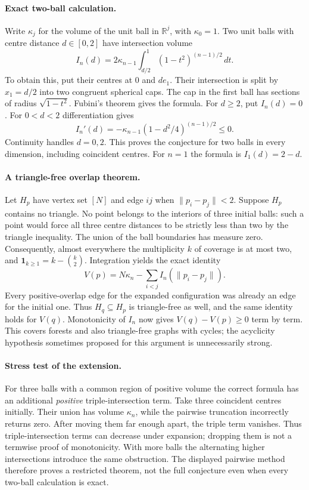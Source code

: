 \documentclass[11pt,a4paper]{article}
\begin{document}
\paragraph{Exact two-ball calculation.}
Write $\kappa_j$ for the volume of the unit ball in $\mathbb R^j$, with
$\kappa_0=1$. Two unit balls with centre distance $d\in[0,2]$ have intersection
volume
\[
 I_n(d)=2\kappa_{n-1}\int_{d/2}^1(1-t^2)^{(n-1)/2}\,dt.
\]
To obtain this, put their centres at $0$ and $d e_1$. Their intersection is
split by $x_1=d/2$ into two congruent spherical caps. The cap in the first
ball has sections of radius $\sqrt{1-t^2}$. Fubini's theorem gives the formula.
For $d\ge2$, put $I_n(d)=0$. For $0<d<2$ differentiation gives
\[
 I_n'(d)=-\kappa_{n-1}(1-d^2/4)^{(n-1)/2}\le0.
\]
Continuity handles $d=0,2$. This proves the conjecture for two balls in every
dimension, including coincident centres. For $n=1$ the formula is $I_1(d)=2-d$.

\paragraph{A triangle-free overlap theorem.}
Let $H_p$ have vertex set $[N]$ and edge $ij$ when $\|p_i-p_j\|<2$.
Suppose $H_p$ contains no triangle. No point belongs to the interiors of three
initial balls: such a point would force all three centre distances to be
strictly less than two by the triangle inequality. The union of the ball
boundaries has measure zero. Consequently, almost everywhere the multiplicity
$k$ of coverage is at most two, and
$\mathbf1_{k\ge1}=k-\binom{k}{2}$. Integration yields the exact identity
\[
 V(p)=N\kappa_n-\sum_{i<j}I_n(\|p_i-p_j\|).
\]
Every positive-overlap edge for the expanded configuration was already an
edge for the initial one. Thus $H_q\subseteq H_p$ is triangle-free as well,
and the same identity holds for $V(q)$. Monotonicity of $I_n$ now gives
$V(q)-V(p)\ge0$ term by term. This covers forests and also triangle-free graphs
with cycles; the acyclicity hypothesis sometimes proposed for this argument
is unnecessarily strong.

\paragraph{Stress test of the extension.}
For three balls with a common region of positive volume the correct formula
has an additional \emph{positive} triple-intersection term. Take three coincident
centres initially. Their union has volume $\kappa_n$, while the pairwise
truncation incorrectly returns zero. After moving them far enough apart,
the triple term vanishes. Thus triple-intersection terms can decrease under
expansion; dropping them is not a termwise proof of monotonicity. With more
balls the alternating higher intersections introduce the same obstruction.
The displayed pairwise method therefore proves a restricted theorem, not the
full conjecture even when every two-ball calculation is exact.
\end{document}

